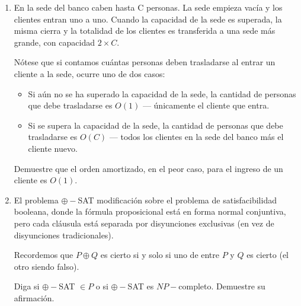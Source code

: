 \documentclass[letterpaper, 12pt]{article}
\begin{document}
\begin{enumerate}
\item  En la sede del banco caben hasta C personas. La sede empieza vacía y los
clientes entran uno a uno. Cuando la capacidad de la sede es superada, la misma cierra y la totalidad de los clientes es transferida a una sede más grande, con capacidad $2 \times C$.

Nótese que si contamos cuántas personas deben trasladarse al entrar un cliente a la sede, ocurre uno de dos casos:

\begin{itemize}
    \item Si aún no se ha superado la capacidad de la sede, la cantidad de personas que debe trasladarse es $O(1)$ — únicamente el cliente que entra.
    \item Si se supera la capacidad de la sede, la cantidad de personas que debe trasladarse es $O(C)$ — todos los clientes en la sede del banco más el cliente nuevo.
\end{itemize}

Demuestre que el orden amortizado, en el peor caso, para el ingreso de un cliente es $O(1)$. \\

\item El problema $\oplus-$SAT modificación sobre el problema de satisfacibilidad booleana, donde la fórmula proposicional está en forma normal conjuntiva, pero cada cláusula está separada por disyunciones exclusivas (en vez de disyunciones tradicionales).

Recordemos que $P \oplus Q$ es cierto si y solo si uno de entre $P$ y $Q$ es cierto (el otro siendo falso).

Diga si $\oplus-$SAT $\in P$ o si $\oplus-$SAT es $NP-$completo. Demuestre su afirmación.



\end{enumerate} \vspace{4mm}
\end{document}
